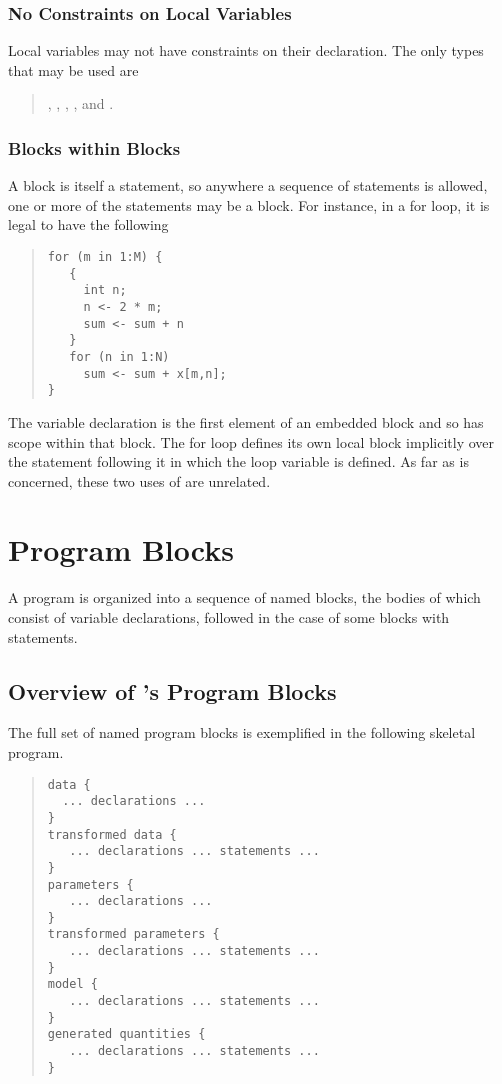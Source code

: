 \subsection{No Constraints on Local Variables}

Local variables may not have constraints on their declaration.  The
only types that may be used are
%
\begin{quote}
, , 
, , and .
\end{quote}

\subsection{Blocks within Blocks}

A block is itself a statement, so anywhere a sequence of statements is
allowed, one or more of the statements may be a block.  For instance,
in a for loop, it is legal to have the following
%
\begin{quote}
\begin{Verbatim}
for (m in 1:M) {
   { 
     int n;  
     n <- 2 * m; 
     sum <- sum + n 
   }
   for (n in 1:N) 
     sum <- sum + x[m,n];
}
\end{Verbatim}
\end{quote}
%
The variable declaration  is the first element of an
embedded block and so has scope within that block.  The for loop
defines its own local block implicitly over the statement following it
in which the loop variable is defined.  As far as \Stan is concerned,
these two uses of  are unrelated.  



\chapter{Program Blocks}\label{blocks.chapter}

\noindent
A \Stan program is organized into a sequence of named blocks, the
bodies of which consist of variable declarations, followed in the case
of some blocks with statements.  

\section{Overview of \Stan's Program Blocks}

The full set of named program blocks is exemplified in the following
skeletal \Stan program.
%
\begin{quote}
\begin{Verbatim} 
data { 
  ... declarations ...
}
transformed data { 
   ... declarations ... statements ... 
}
parameters { 
   ... declarations ... 
}
transformed parameters { 
   ... declarations ... statements ...
}
model { 
   ... declarations ... statements ...
}
generated quantities {
   ... declarations ... statements ...
}
\end{Verbatim}
\end{quote}
%

